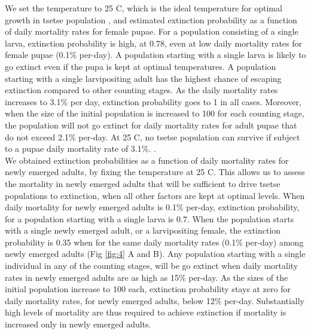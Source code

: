\documentclass[smallextended]{svjour3}
\begin{document}
We set the temperature to 25 \degree C, which is the ideal temperature for optimal growth in tsetse population
\cite{Pagabeleguem2016f,Are2019}, and estimated extinction probability as a function of daily mortality rates for female pupae. For a population consisting of a single larva, extinction probability is high, at 0.78, even at low daily mortality rates for female pupae (0.1\% per-day). A population starting with a single larva is likely to go extinct even if the pupa is kept at optimal temperatures. A population starting with a single larvipositing adult has the highest chance of escaping extinction compared to other counting stages. As the daily mortality rates increases to 3.1\% per day, extinction probability goes to 1 in all cases. Moreover, when the size of the initial population is increased to 100 for each counting stage, the population will not go extinct for daily mortality rates for adult pupae that do not exceed 2.1\% per-day. At 25 \degree C, no tsetse population can survive if subject to a pupae daily mortality rate of 3.1\%. \cite{Hargrove2019a}. \\ 


We obtained extinction probabilities as a function of daily mortality rates for newly emerged adults, by
fixing the temperature at 25 \degree C. This allows us to assess the mortality in newly emerged adults that will be sufficient to drive tsetse populations to extinction, when all other factors are kept at optimal levels. When daily mortality for newly emerged adults is 0.1\% per-day, extinction probability, for a population starting with a single larva is 0.7. When the population starts with a single newly emerged adult, or a larvipositing female, the extinction probability is 0.35 when for the same daily mortality rates (0.1\% per-day) among  newly emerged adults (Fig \ref{fig:4} A and B). Any population starting with a single individual in any of the counting stages, will be go extinct when daily mortality rates in newly emerged adults are as high as 15\% per-day. As the sizes of the initial population increase to 100 each, extinction probability stays at zero for daily mortality rates, for newly emerged adults, below 12\% per-day. Substantially high levels of mortality are thus required to achieve extinction if mortality is increased only in newly emerged adults.
 
\end{document}
